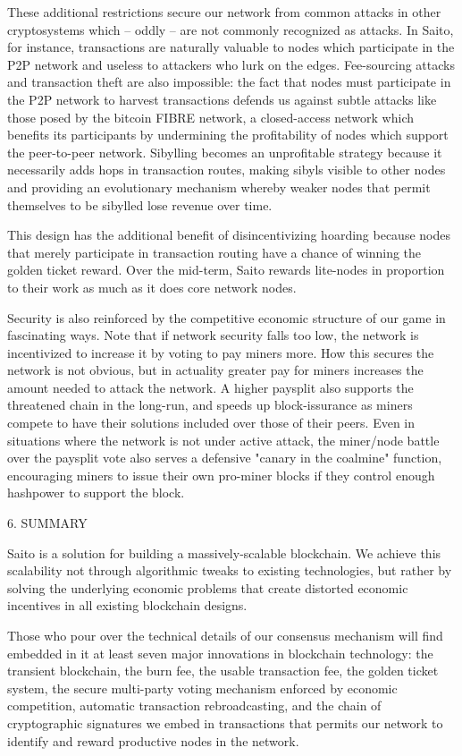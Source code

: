 \documentclass[11.5pt, oneside]{article}   	%
\begin{document}
\begin{multicols}{2}
These additional restrictions secure our network from common attacks in other cryptosystems which -- oddly -- are not commonly recognized as attacks. In Saito, for instance, transactions are naturally valuable to nodes which participate in the P2P network and useless to attackers who lurk on the edges. Fee-sourcing attacks and transaction theft are also impossible: the fact that nodes must participate in the P2P network to harvest transactions defends us against subtle attacks like those posed by the bitcoin FIBRE network, a closed-access network which benefits its participants by undermining the profitability of nodes which support the peer-to-peer network. Sibylling becomes an unprofitable strategy because it necessarily adds hops in transaction routes, making sibyls visible to other nodes and providing an evolutionary mechanism whereby weaker nodes that permit themselves to be sibylled lose revenue over time. 

This design has the additional benefit of disincentivizing hoarding because nodes that merely participate in transaction routing have a chance of winning the golden ticket reward. Over the mid-term, Saito rewards lite-nodes in proportion to their work as much as it does core network nodes.

Security is also reinforced by the competitive economic structure of our game in fascinating ways. Note that if network security falls too low, the network is incentivized to increase it by voting to pay miners more. How this secures the network is not obvious, but in actuality greater pay for miners increases the amount needed to attack the network. A higher paysplit also supports the threatened chain in the long-run, and speeds up block-issurance as miners compete to have their solutions included over those of their peers. Even in situations where the network is not under active attack, the miner/node battle over the paysplit vote also serves a defensive "canary in the coalmine" function, encouraging miners to issue their own pro-miner blocks if they control enough hashpower to support the block.

6. SUMMARY

Saito is a solution for building a massively-scalable blockchain. We achieve this scalability not through algorithmic tweaks to existing technologies, but rather by solving the underlying economic problems that create distorted economic incentives in all existing blockchain designs.

Those who pour over the technical details of our consensus mechanism will find embedded in it at least seven major innovations in blockchain technology: the transient blockchain, the burn fee, the usable transaction fee, the golden ticket system, the secure multi-party voting mechanism enforced by economic competition, automatic transaction rebroadcasting, and the chain of cryptographic signatures we embed in transactions that permits our network to identify and reward productive nodes in the network.  


\end{multicols}
\end{document}
